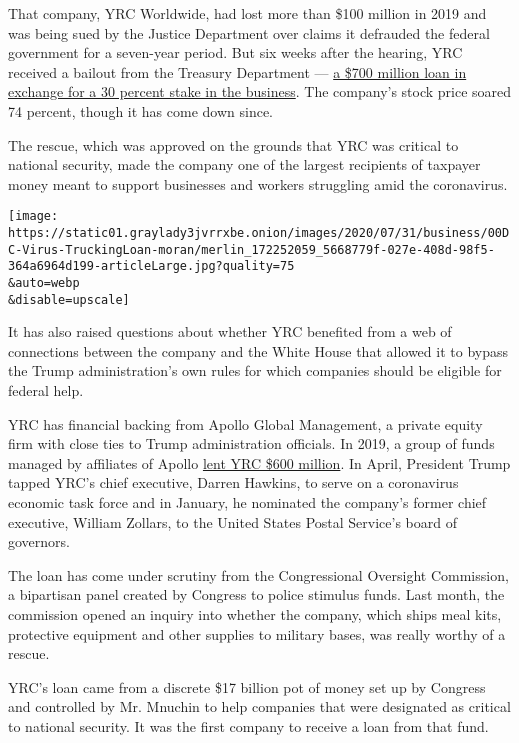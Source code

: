 That company, YRC Worldwide, had lost more than \$100 million in 2019
and was being sued by the Justice Department over claims it defrauded
the federal government for a seven-year period. But six weeks after the
hearing, YRC received a bailout from the Treasury Department ---
\href{https://home.treasury.gov/system/files/136/YRC-Transaction-Summary.pdf}{a
\$700 million loan in exchange for a 30 percent stake in the business}.
The company's stock price soared 74 percent, though it has come down
since.

The rescue, which was approved on the grounds that YRC was critical to
national security, made the company one of the largest recipients of
taxpayer money meant to support businesses and workers struggling amid
the coronavirus.

\texttt{[image: https://static01.graylady3jvrrxbe.onion/images/2020/07/31/business/00DC-Virus-TruckingLoan-moran/merlin\_172252059\_5668779f-027e-408d-98f5-364a6964d199-articleLarge.jpg?quality=75\\\&auto=webp\\\&disable=upscale]}

It has also raised questions about whether YRC benefited from a web of
connections between the company and the White House that allowed it to
bypass the Trump administration's own rules for which companies should
be eligible for federal help.

YRC has financial backing from Apollo Global Management, a private
equity firm with close ties to Trump administration officials. In 2019,
a group of funds managed by affiliates of Apollo
\href{http://investors.yrcw.com/news-releases/news-release-details/yrc-worldwide-announces-new-term-loan-agreement}{lent
YRC \$600 million}. In April, President Trump tapped YRC's chief
executive, Darren Hawkins, to serve on a coronavirus economic task force
and in January, he nominated the company's former chief executive,
William Zollars, to the United States Postal Service's board of
governors.

The loan has come under scrutiny from the Congressional Oversight
Commission, a bipartisan panel created by Congress to police stimulus
funds. Last month, the commission opened an inquiry into whether the
company, which ships meal kits, protective equipment and other supplies
to military bases, was really worthy of a rescue.

YRC's loan came from a discrete \$17 billion pot of money set up by
Congress and controlled by Mr. Mnuchin to help companies that were
designated as critical to national security. It was the first company to
receive a loan from that fund.

